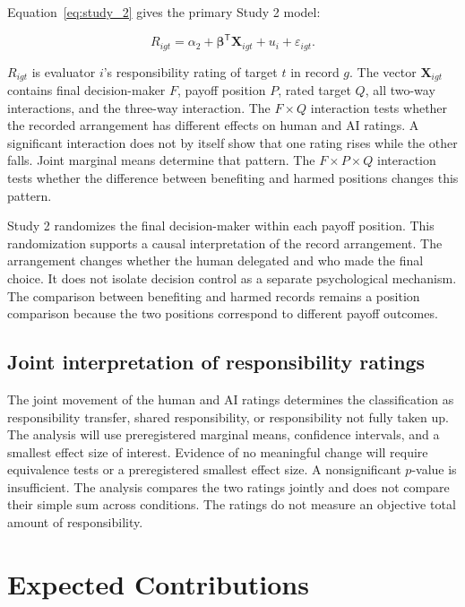 \documentclass[11pt,a4paper]{article}
\begin{document}
Equation~\ref{eq:study_2} gives the primary Study 2 model:

\begin{equation}
R_{igt}=\alpha_2+\boldsymbol{\beta}^{\mathsf{T}}\mathbf{X}_{igt}+u_i+\varepsilon_{igt}.
\label{eq:study_2}
\end{equation}

$R_{igt}$ is evaluator $i$'s responsibility rating of target $t$ in record $g$. The vector $\mathbf{X}_{igt}$ contains final decision-maker $F$, payoff position $P$, rated target $Q$, all two-way interactions, and the three-way interaction. The $F\times Q$ interaction tests whether the recorded arrangement has different effects on human and AI ratings. A significant interaction does not by itself show that one rating rises while the other falls. Joint marginal means determine that pattern. The $F\times P\times Q$ interaction tests whether the difference between benefiting and harmed positions changes this pattern.

Study 2 randomizes the final decision-maker within each payoff position. This randomization supports a causal interpretation of the record arrangement. The arrangement changes whether the human delegated and who made the final choice. It does not isolate decision control as a separate psychological mechanism. The comparison between benefiting and harmed records remains a position comparison because the two positions correspond to different payoff outcomes.

\subsection{Joint interpretation of responsibility ratings}

The joint movement of the human and AI ratings determines the classification as responsibility transfer, shared responsibility, or responsibility not fully taken up. The analysis will use preregistered marginal means, confidence intervals, and a smallest effect size of interest. Evidence of no meaningful change will require equivalence tests or a preregistered smallest effect size. A nonsignificant $p$-value is insufficient. The analysis compares the two ratings jointly and does not compare their simple sum across conditions. The ratings do not measure an objective total amount of responsibility.

\section{Expected Contributions}
\end{document}
